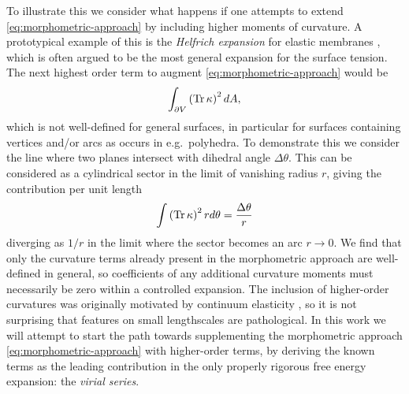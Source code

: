 \documentclass[11pt,twoside]{report}
\begin{document}
To illustrate this we consider what happens if one attempts to extend \eqref{eq:morphometric-approach} by including higher moments of curvature.
A prototypical example of this is the \emph{Helfrich expansion} for elastic membranes \cite{HelfrichZFNC1973}, which is often argued to be the most general expansion for the surface tension.
The next highest order term to augment \eqref{eq:morphometric-approach} would be
\begin{equation*}
  \int_{\partial V} \left(\operatorname*{Tr}{\kappa}\right)^2 dA,
\end{equation*}
which is not well-defined for general surfaces, in particular for surfaces containing vertices and/or arcs as occurs in e.g.\ polyhedra.
To demonstrate this we consider the line where two planes intersect with dihedral angle $\Delta \theta$.
This can be considered as a cylindrical sector in the limit of vanishing radius $r$, giving the contribution per unit length
\begin{equation*}
  \int \left(\operatorname*{Tr}{\kappa}\right)^2 r d\theta
  = \frac{\Delta \theta}{r}
\end{equation*}
diverging as $1 / r$ in the limit where the sector becomes an arc $r \to 0$.
We find that only the curvature terms already present in the morphometric approach are well-defined in general, so coefficients of any additional curvature moments must necessarily be zero within a controlled expansion.
The inclusion of higher-order curvatures was originally motivated by continuum elasticity \cite{HelfrichZFNC1973}, so it is not surprising that features on small lengthscales are pathological.
In this work we will attempt to start the path towards supplementing the morphometric approach \eqref{eq:morphometric-approach} with higher-order terms, by deriving the known terms as the leading contribution in the only properly rigorous free energy expansion: the \emph{virial series}.


\end{document}
